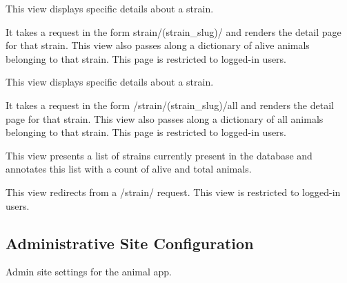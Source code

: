 \documentclass[letterpaper,10pt,english]{sphinxmanual}
\begin{document}

\begin{fulllineitems}
\label{api:animal.views.strain_detail}
This view displays specific details about a strain.

It takes a request in the form strain/(strain\_slug)/ and renders the detail page for that strain.
This view also passes along a dictionary of alive animals belonging to that strain.
This page is restricted to logged-in users.

\end{fulllineitems}


\begin{fulllineitems}
\label{api:animal.views.strain_detail_all}
This view displays specific details about a strain.

It takes a request in the form /strain/(strain\_slug)/all and renders the detail page for that strain.
This view also passes along a dictionary of all animals belonging to that strain.
This page is restricted to logged-in users.

\end{fulllineitems}


\begin{fulllineitems}
\label{api:animal.views.strain_list}
This view presents a list of strains currently present in the database and annotates this list with a count of alive and total animals.

This view redirects from a /strain/ request.
This view is restricted to logged-in users.

\end{fulllineitems}

\label{api:module-animal.urls}

\subsection{Administrative Site Configuration}
\label{api:id4}\label{api:module-animal.admin}
Admin site settings for the animal app.
\end{document}
